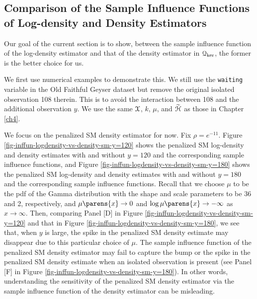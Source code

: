 \subsection{Comparison of the Sample Influence Functions of Log-density and Density Estimators}\label{subsection-sample-inf-fun-logden-vs-den}

Our goal of the current section is to show, between the sample influence function of the log-density estimator and that of the density estimator in $\mathcal{Q}_{\ker}$, the former is the better choice for us. 

We first use numerical examples to demonstrate this. We still use the \texttt{waiting} variable in the Old Faithful Geyser dataset but remove the original isolated observation 108 therein. This is to avoid the interaction between 108 and the additional observation $y$. We use the same $\mathcal{X}$, $k$, $\mu$, and $\widetilde{\mathcal{H}}$ as those in Chapter \ref{ch4}. 

We focus on the penalized SM density estimator for now. Fix $\rho = e^{-11}$. Figure \ref{fig-inffun-logdensity-vs-density-sm-y=120} shows the penalized SM log-density and density estimates with and without $y = 120$ and the corresponding sample influence functions, and Figure \ref{fig-inffun-logdensity-vs-density-sm-y=180} shows the penalized SM log-density and density estimates with and without $y = 180$ and the corresponding sample influence functions. Recall that we choose $\mu$ to be the pdf of the Gamma distribution with the shape and scale parameters to be 36 and 2, respectively, and $\mu \parens{x} \to 0$ and $\log \mu \parens{x} \to -\infty$ as $x \to \infty$. Then, comparing Panel [D] in Figure \ref{fig-inffun-logdensity-vs-density-sm-y=120} and that in Figure \ref{fig-inffun-logdensity-vs-density-sm-y=180}, we see that, when $y$ is large, the spike in the penalized SM density estimate may disappear due to this particular choice of $\mu$. The sample influence function of the penalized SM density estimator may fail to capture the bump or the spike in the penalized SM density estimate when an isolated observation is present (see Panel [F] in Figure \ref{fig-inffun-logdensity-vs-density-sm-y=180}). In other words, understanding the sensitivity of the penalized SM density estimator via the sample influence function of the density estimator can be misleading. %

